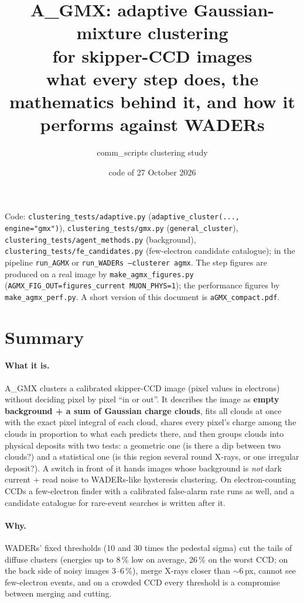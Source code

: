 \documentclass[11pt,a4paper]{article}
\title{\textbf{A\_GMX: adaptive Gaussian-mixture clustering\\for skipper-CCD images}\\[4pt]
\large what every step does, the mathematics behind it, and how it performs against WADERs}
\author{comm\_scripts clustering study}
\date{code of 27 October 2026}
\newcommand{\AGMX}{A\_GMX}
\newcommand{\code}[1]{\texttt{#1}}
\begin{document}
\maketitle

\noindent\small\sloppy Code: \code{clustering\_tests/adaptive.py} (\code{adaptive\_cluster(..., engine="gmx")}),
\code{clustering\_tests/gmx.py} (\code{general\_cluster}), \code{clustering\_tests/agent\_methods.py} (background),
\code{clustering\_tests/fe\_candidates.py} (few-electron candidate catalogue); in the pipeline \code{run\_AGMX} or
\code{run\_WADERs --clusterer agmx}. The step figures are produced on a real image by \code{make\_agmx\_figures.py}
(\code{AGMX\_FIG\_OUT=figures\_current MUON\_PHYS=1}); the performance figures by \code{make\_agmx\_perf.py}. A short
version of this document is \code{aGMX\_compact.pdf}.\normalsize

\tableofcontents
\clearpage

\section{Summary}

\paragraph{What it is.} \AGMX{} clusters a calibrated skipper-CCD image (pixel values in electrons) without deciding pixel by
pixel ``in or out''. It describes the image as \textbf{empty background + a sum of Gaussian charge clouds}, fits all clouds at
once with the exact pixel integral of each cloud, shares every pixel's charge among the clouds in proportion to what each
predicts there, and then groups clouds into physical deposits with two tests: a geometric one (is there a dip between two
clouds?) and a statistical one (is this region several round X-rays, or one irregular deposit?). A switch in front of it hands
images whose background is \emph{not} dark current + read noise to WADERs-like hysteresis clustering. On electron-counting
CCDs a few-electron finder with a calibrated false-alarm rate runs as well, and a candidate catalogue for rare-event
searches is written after it.

\paragraph{Why.} WADERs' fixed thresholds (10 and 30 times the pedestal sigma) cut the tails of diffuse clusters (energies up
to 8\,\% low on average, 26\,\% on the worst CCD; on the back side of noisy images 3--6\,\%), merge X-rays closer than
$\sim$6\,px, cannot see few-electron events, and on a crowded CCD every threshold is a compromise between merging and cutting.
\end{document}
